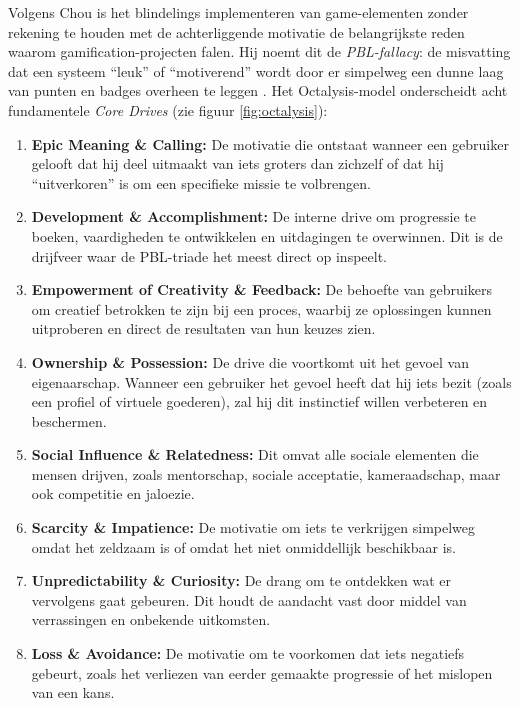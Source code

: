 Volgens Chou is het blindelings implementeren van game-elementen zonder rekening te houden met de achterliggende motivatie de belangrijkste reden waarom gamification-projecten falen.
Hij noemt dit de \textit{PBL-fallacy}: de misvatting dat een systeem \enquote{leuk} of \enquote{motiverend} wordt door er simpelweg een dunne laag van punten en badges overheen te leggen \autocite{Chou2015}.
Het Octalysis-model onderscheidt acht fundamentele \textit{Core Drives} (zie figuur \ref{fig:octalysis}):

\begin{enumerate}
    \item \textbf{Epic Meaning \& Calling:} De motivatie die ontstaat wanneer een gebruiker gelooft dat hij deel uitmaakt van iets groters dan zichzelf of dat hij \enquote{uitverkoren} is om een specifieke missie te volbrengen.
    \item \textbf{Development \& Accomplishment:} De interne drive om progressie te boeken, vaardigheden te ontwikkelen en uitdagingen te overwinnen. Dit is de drijfveer waar de PBL-triade het meest direct op inspeelt.
    \item \textbf{Empowerment of Creativity \& Feedback:} De behoefte van gebruikers om creatief betrokken te zijn bij een proces, waarbij ze oplossingen kunnen uitproberen en direct de resultaten van hun keuzes zien.
    \item \textbf{Ownership \& Possession:} De drive die voortkomt uit het gevoel van eigenaarschap. Wanneer een gebruiker het gevoel heeft dat hij iets bezit (zoals een profiel of virtuele goederen), zal hij dit instinctief willen verbeteren en beschermen.
    \item \textbf{Social Influence \& Relatedness:} Dit omvat alle sociale elementen die mensen drijven, zoals mentorschap, sociale acceptatie, kameraadschap, maar ook competitie en jaloezie.
    \item \textbf{Scarcity \& Impatience:} De motivatie om iets te verkrijgen simpelweg omdat het zeldzaam is of omdat het niet onmiddellijk beschikbaar is.
    \item \textbf{Unpredictability \& Curiosity:} De drang om te ontdekken wat er vervolgens gaat gebeuren. Dit houdt de aandacht vast door middel van verrassingen en onbekende uitkomsten.
    \item \textbf{Loss \& Avoidance:} De motivatie om te voorkomen dat iets negatiefs gebeurt, zoals het verliezen van eerder gemaakte progressie of het mislopen van een kans.
\end{enumerate}

